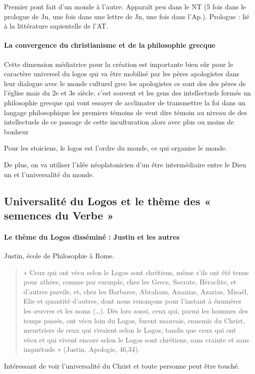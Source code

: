       Premier pont fait d'un monde à l'autre. Apparaît peu dans le NT (5 fois dans le prologue de Jn, une fois dans une lettre de Jn, une fois dans l'Ap.).
    Prologue : lié à la littérature sapientelle de l'AT.
      
     
      
      \paragraph{La convergence du christianisme et de la philosophie grecque}
     
         Cette dimension médiatrice pour la création est importante bien sûr pour le caractère universel du logos qui va être mobilisé par les pères apologistes dans leur dialogue avec le monde culturel grec les apologistes ce sont des des pères de l'église mais du 2e et 3e siècle. c'est souvent et les gens des intellectuels formés un philosophie grecque qui vont essayer de acclimater de transmettre la foi dans un langage philosophique les premiers témoins de veut dire témoin au niveau de des intellectuels de ce passage de cette inculturation alors avec plus ou moins de bonheur  
  
   \begin{Def}
    Pour les stoiciens, le logos est l'ordre du monde, ce qui organise le monde.
   \end{Def}
   De plus, on va utiliser l'idée néoplatonicien d'un être intermédiaire entre le Dieu un et l'universalité du monde.  
    
    \subsection{Universalité du Logos et le thème des « semences du Verbe »}
    

  

     
      
       \paragraph{Le thème du Logos disséminé : Justin et les autres}
       Justin, école de Philosophie à Rome. 
      
     \begin{quote}
         «  Ceux  qui  ont  vécu  selon  le  Logos  sont  chrétiens,  même  s’ils  ont  été  tenus  pour  athées, comme  par  exemple,  chez  les  Grecs,  Socrate,  Héraclite,  et  d’autres  pareils,  et,  chez  les Barbares,  Abraham,  Ananias,  Azarias,  Misaël,  Elie  et  quantité  d’autres,  dont  nous  renonçons pour  l’instant  à  énumérer  les  œuvres  et  les  noms  (…).  Dès  lors  aussi,  ceux  qui,  parmi  les hommes  des  temps  passés,  ont  vécu  loin  du  Logos,  furent  mauvais,  ennemis  du  Christ, meurtriers  de  ceux  qui  vivaient  selon  le  Logos,  tandis  que  ceux  qui  ont  vécu  et  qui  vivent encore  selon  le  Logos  sont  chrétiens,  sans  crainte  et  sans  inquiétude  »  (Justin,  Apologie,  46,34).   
     \end{quote}
      Intéressant de voir l'universalité du Christ et toute personne peut être touché. 
    
